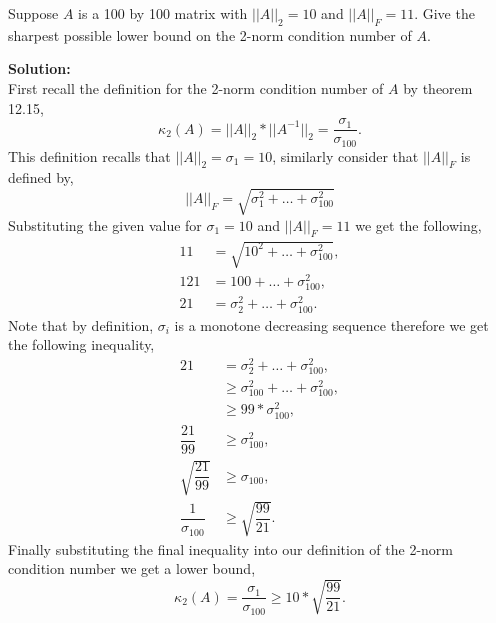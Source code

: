 \documentclass[12pt]{article}
\makeatletter
\theoremstyle{homework}
\newenvironment{exercise}[1]
{\def\@currentlabel{#1}\exercisecore}
{\endexercisecore}
\newcommand{\localhead}[1]{\par\smallskip\noindent\textbf{#1}\nobreak\\}%
\newcommand\solution{\localhead{Solution:}}
\makeatother
\begin{document}
\begin{exercise}{P18} Suppose $A$ is a 100 by 100 matrix with $||A||_2 = 10$ and $||A||_F = 11$. Give the sharpest possible lower bound on 
  the 2-norm condition number of $A$.\\ 
  \solution First recall the definition for the 2-norm condition number of $A$ by theorem 12.15, 
  \begin{equation*}
    \kappa_2(A) =||A||_2*||A^{-1}||_2 = \dfrac{\sigma_1}{\sigma_{100}}. 
  \end{equation*}
  This definition recalls that $||A||_2 = \sigma_1 = 10$, similarly consider that $||A||_F$ is defined by, 
  \begin{equation*}
    ||A||_F =\sqrt{\sigma_1^2 + \dots + \sigma_{100}^2}
  \end{equation*} 
  Substituting the given value for $\sigma_1 = 10$ and $||A||_F = 11$ we get the following, 
  \begin{align*}
    11 &= \sqrt{10^2 + \dots + \sigma_{100}^2},\\
    121 &= 100 + \dots + \sigma_{100}^2,\\
    21 &= \sigma_2^2 + \dots + \sigma_{100}^2.
    \end{align*}
    Note that by definition, $\sigma_i$ is a monotone decreasing sequence therefore we get the following inequality, 
    \begin{align*}
      21 &= \sigma_2^2 + \dots + \sigma_{100}^2,\\
         &\geq \sigma_{100}^2 + \dots + \sigma_{100}^2,\\
         &\geq 99*\sigma_{100}^2,\\
       \dfrac{21}{99}  &\geq \sigma_{100}^2,\\
       \sqrt{\dfrac{21}{99}}&\geq \sigma_{100},\\
       \dfrac{1}{\sigma_{100}} &\geq \sqrt{\dfrac{99}{21}}.
    \end{align*}
    Finally substituting the final inequality into our definition of the 2-norm condition number we get a lower bound, 
    \begin{equation*}
      \kappa_2(A) = \dfrac{\sigma_1}{\sigma_{100}} \geq 10*\sqrt{\dfrac{99}{21}}.
    \end{equation*}  
\end{exercise}
\vspace{1in}
\end{document}
